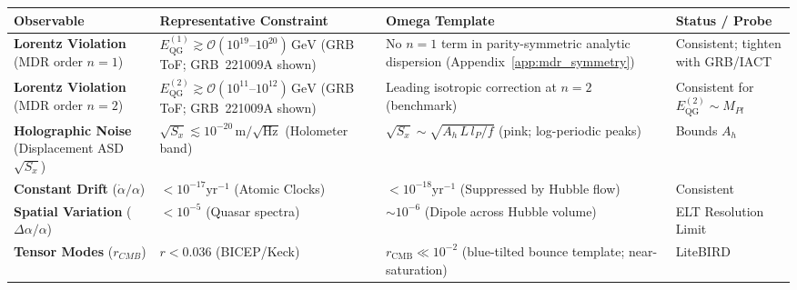 \begin{table}[ht]
    \centering
    \small
    \renewcommand{\arraystretch}{1.2}
    \begin{tabular}{|p{3cm}|p{3cm}|p{4.5cm}|p{3.5cm}|}
    \hline
    \textbf{Observable} & \textbf{Representative Constraint} & \textbf{Omega Template} & \textbf{Status / Probe} \\ 
    \hline
    \textbf{Lorentz Violation} \newline (MDR order $n=1$) & $E^{(1)}_{\mathrm{QG}} \gtrsim \mathcal{O}(10^{19}\text{--}10^{20})\,\mathrm{GeV}$ \newline (GRB ToF; GRB~221009A shown) \cite{Abdo2009,Vasileiou2013,Hua2025DisCan} & No $n=1$ term in parity-symmetric analytic dispersion \newline (Appendix~\ref{app:mdr_symmetry}) & Consistent; tighten with GRB/IACT \\
    \hline
    \textbf{Lorentz Violation} \newline (MDR order $n=2$) & $E^{(2)}_{\mathrm{QG}} \gtrsim \mathcal{O}(10^{11}\text{--}10^{12})\,\mathrm{GeV}$ \newline (GRB ToF; GRB~221009A shown) \cite{Vasileiou2013,Hua2025DisCan} & Leading isotropic correction at $n=2$ (benchmark) & Consistent for $E^{(2)}_{\mathrm{QG}}\sim M_{Pl}$ \\
    \hline
    \textbf{Holographic Noise} \newline (Displacement ASD $\sqrt{S_x}$) & $\sqrt{S_x} \lesssim 10^{-20}\,\mathrm{m}/\sqrt{\mathrm{Hz}}$ \newline (Holometer band) & $\sqrt{S_x} \sim \sqrt{A_h\,L\,l_P/f}$ \newline (pink; log-periodic peaks) & Bounds $A_h$ \\
    \hline
    \textbf{Constant Drift} \newline ($\dot{\alpha}/\alpha$) & $< 10^{-17} \text{yr}^{-1}$ \newline (Atomic Clocks) \cite{Rosenband2008} & $< 10^{-18} \text{yr}^{-1}$ \newline (Suppressed by Hubble flow) & Consistent \\
    \hline
    \textbf{Spatial Variation} \newline ($\Delta \alpha/\alpha$) & $< 10^{-5}$ \newline (Quasar spectra) \cite{Webb2011AlphaDipole} & $\sim 10^{-6}$ \newline (Dipole across Hubble volume) & ELT Resolution Limit \\
    \hline
    \textbf{Tensor Modes} \newline ($r_{CMB}$) & $r < 0.036$ \newline (BICEP/Keck) \cite{BICEPKeck2021} & $r_{\mathrm{CMB}}\ll 10^{-2}$ \newline (blue-tilted bounce template; near-saturation) & LiteBIRD \\

\end{tabular}
\end{table}
